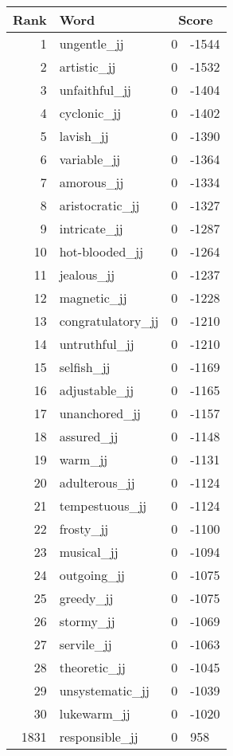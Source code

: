 \begin{longtable}[!htbp]{| rlr@{.}l |}
    \hline
    \textbf{Rank} & \textbf{Word} & \multicolumn{2}{c|}{\textbf{Score}} \\
    \hline
    \endhead
    1 & ungentle\_jj & 0 & -1544 \\
    2 & artistic\_jj & 0 & -1532 \\
    3 & unfaithful\_jj & 0 & -1404 \\
    4 & cyclonic\_jj & 0 & -1402 \\
    5 & lavish\_jj & 0 & -1390 \\
    6 & variable\_jj & 0 & -1364 \\
    7 & amorous\_jj & 0 & -1334 \\
    8 & aristocratic\_jj & 0 & -1327 \\
    9 & intricate\_jj & 0 & -1287 \\
    10 & hot-blooded\_jj & 0 & -1264 \\
    11 & jealous\_jj & 0 & -1237 \\
    12 & magnetic\_jj & 0 & -1228 \\
    13 & congratulatory\_jj & 0 & -1210 \\
    14 & untruthful\_jj & 0 & -1210 \\
    15 & selfish\_jj & 0 & -1169 \\
    16 & adjustable\_jj & 0 & -1165 \\
    17 & unanchored\_jj & 0 & -1157 \\
    18 & assured\_jj & 0 & -1148 \\
    19 & warm\_jj & 0 & -1131 \\
    20 & adulterous\_jj & 0 & -1124 \\
    21 & tempestuous\_jj & 0 & -1124 \\
    22 & frosty\_jj & 0 & -1100 \\
    23 & musical\_jj & 0 & -1094 \\
    24 & outgoing\_jj & 0 & -1075 \\
    25 & greedy\_jj & 0 & -1075 \\
    26 & stormy\_jj & 0 & -1069 \\
    27 & servile\_jj & 0 & -1063 \\
    28 & theoretic\_jj & 0 & -1045 \\
    29 & unsystematic\_jj & 0 & -1039 \\
    30 & lukewarm\_jj & 0 & -1020 \\
    1831 & responsible\_jj & 0 & 958 \\

\end{longtable}
